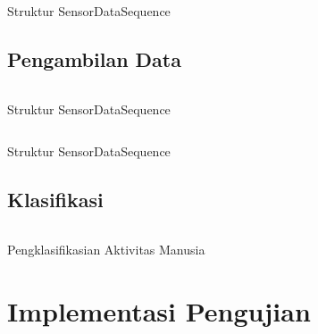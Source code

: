 \begin{listing}[h]
    \inputminted[firstline=9,firstnumber=9,lastline=13]{java}{../aktvtas/app/src/main/java/org/elins/aktvtas/sensor/SensorDataSequence.java}
    \caption{Struktur SensorDataSequence}
    \label{listing:sensor-data-sequence}
\end{listing}

\subsection{Pengambilan Data}
\begin{listing}[h]
    \inputminted[firstline=47,firstnumber=47,lastline=56,gobble=4]{java}{../aktvtas/app/src/main/java/org/elins/aktvtas/sensor/SensorService.java}
    \caption{Struktur SensorDataSequence}
    \label{listing:sensor-data-sequence}
\end{listing}

\begin{listing}[h]
    \inputminted[firstline=83,firstnumber=83,lastline=114,gobble=4]{java}{../aktvtas/app/src/main/java/org/elins/aktvtas/PredictionService.java}
    \caption{Struktur SensorDataSequence}
    \label{listing:sensor-data-sequence}
\end{listing}

\subsection{Klasifikasi}

\begin{listing}[h]
    \inputminted[firstline=34,firstnumber=34,lastline=56,gobble=4]{java}{../aktvtas/app/src/main/java/org/elins/aktvtas/human/HumanActivityClassifier.java}
    \caption{Pengklasifikasian Aktivitas Manusia}
    \label{listing:klasifikasi-aktivitas}
\end{listing}

\section{Implementasi Pengujian}
